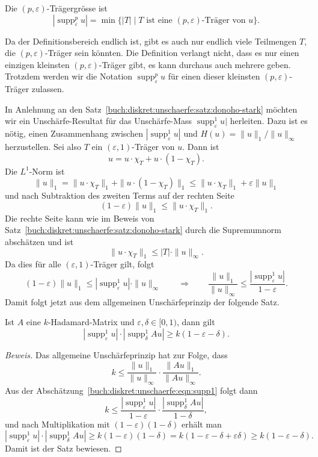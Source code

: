 \begin{definition}
Die $(p,\varepsilon)$-Trägergrösse ist
\[
|\operatorname{supp}_\varepsilon^p u|
=
\min \{ |T|\mid \text{$T$ ist eine $(p,\varepsilon)$-Träger von $u$}\}.
\]
\end{definition}

Da der Definitionsbereich endlich ist, gibt es auch nur endlich viele
Teilmengen $T$, die $(p,\varepsilon)$-Träger sein könnten.
Die Definition verlangt nicht, dass es nur einen einzigen kleinsten
$(p,\varepsilon)$-Träger gibt, es kann durchaus auch mehrere geben.
Trotzdem werden wir die Notation $\operatorname{supp}_\varepsilon^p u$
für einen dieser kleinsten $(p,\varepsilon)$-Träger zulassen.

In Anlehnung an den Satz~\ref{buch:diskret:unschaerfe:satz:donoho-stark}
möchten wir ein Unschärfe-Resultat für das Unschärfe-Mass
$\operatorname{supp}_\varepsilon^1 u|$ herleiten.
Dazu ist es nötig, einen Zusammenhang zwischen
$|\operatorname{supp}_\varepsilon^1 u|$ und $H(u) = \|u\|_1/\|u\|_\infty$ 
herzustellen.
Sei also $T$ ein $(\varepsilon,1)$-Träger von $u$.
Dann ist
\[
u = u\cdot \chi_T + u\cdot (1-\chi_T).
\]
Die $L^1$-Norm ist
\[
\|u\|_1
=
\|u\cdot \chi_T\|_1
+
\|u\cdot (1-\chi_T)\|_1
\le
\|u\cdot \chi_T\|_1
+
\varepsilon \|u\|_1
\]
und nach Subtraktion des zweiten Terms auf der rechten Seite
\[
(1-\varepsilon)\|u\|_1 \le \|u\cdot\chi_T\|_1.
\]
Die rechte Seite kann wie im Beweis von
Satz~\ref{buch:diskret:unschaerfe:satz:donoho-stark}
durch die Supremumnorm abschätzen und ist
\[
\|u\cdot \chi_T\|_1 \le |T| \cdot \|u\|_\infty.
\]
Da dies für alle $(\varepsilon,1)$-Träger gilt, folgt
\begin{equation}
(1-\varepsilon) \|u\|_1
\le
|\operatorname{supp}_\varepsilon^1 u|\cdot \|u\|_\infty
\qquad
\Rightarrow
\qquad
\frac{\|u\|_1}{\|u\|_\infty}
\le
\frac{|\operatorname{supp}_\varepsilon^1 u|}{1-\varepsilon}.
\label{buch:diskret:unschaerfe:eqn:supp1}
\end{equation}
Damit folgt jetzt aus dem allgemeinen Unschärfeprinzip der folgende
Satz.

\begin{satz}
Ist $A$ eine $k$-Hadamard-Matrix und $\varepsilon,\delta\in [0,1)$,
dann gilt
\[
|\operatorname{supp}_\varepsilon^1 u|
\cdot
|\operatorname{supp}_\delta^1 Au|
\ge 
k(1-\varepsilon-\delta).
\]
\end{satz}

\begin{proof}[Beweis]
Das allgemeine Unschärfeprinzip hat zur Folge, dass
\[
k
\le
\frac{\|u\|_1}{\|u\|_\infty}
\cdot
\frac{\|Au\|_1}{\|Au\|_\infty}.
\]
Aus der Abschätzung~\eqref{buch:diskret:unschaerfe:eqn:supp1}
folgt dann
\[
k
\le
\frac{ |\operatorname{supp}_\varepsilon^1 u| }{ 1-\varepsilon }
\cdot
\frac{ |\operatorname{supp}_\delta^1 Au| }{ 1-\delta },
\]
und nach Multiplikation mit $(1-\varepsilon)(1-\delta)$ erhält man
\[
|\operatorname{supp}_\varepsilon^1 u|
\cdot
|\operatorname{supp}_\delta^1 Au|
\ge
k(1-\varepsilon)(1-\delta)
=
k(1-\varepsilon-\delta+\varepsilon\delta)
\ge
k(1-\varepsilon-\delta).
\]
Damit ist der Satz bewiesen.
\end{proof}

